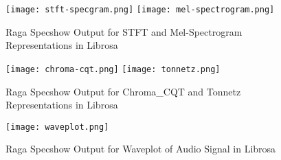\begin{figure}
  \caption{Raga Specshow Output for STFT and Mel-Spectrogram Representations in Librosa}
  \texttt{[image: stft-specgram.png]}
  \vspace*{\floatsep}
  \texttt{[image: mel-spectrogram.png]}
\end{figure}
\begin{figure}
  \caption{Raga Specshow Output for Chroma\_CQT and Tonnetz Representations in Librosa}
  \texttt{[image: chroma-cqt.png]}
  \vspace*{\floatsep}
  \texttt{[image: tonnetz.png]}
\end{figure}
\begin{figure}
  \caption{Raga Specshow Output for Waveplot of Audio Signal in Librosa}
  \texttt{[image: waveplot.png]}
\end{figure}
